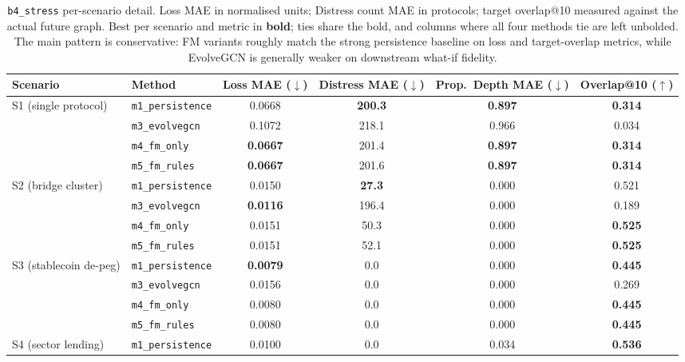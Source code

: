 \begin{table}[!htbp]
\centering
\footnotesize
\setlength{\tabcolsep}{4pt}
\caption{\texttt{b4\_stress} per-scenario detail. Loss MAE in normalised
units; Distress count MAE in protocols; target overlap@10 measured against
the actual future graph. Best per scenario and metric in \textbf{bold};
ties share the bold, and columns where all four methods tie are left
unbolded. The main pattern is conservative: FM variants roughly match the
strong persistence baseline on loss and target-overlap metrics, while
EvolveGCN is generally weaker on downstream what-if fidelity.}
\label{tab:b4_detail}
\begin{tabular}{l l c c c c}
\toprule
Scenario & Method & Loss MAE ($\downarrow$) & Distress MAE ($\downarrow$) & Prop.~Depth MAE ($\downarrow$) & Overlap@10 ($\uparrow$) \\
\midrule
\multirow{4}{*}{S1 (single protocol)}
& \texttt{m1\_persistence} & 0.0668 & \textbf{200.3} & \textbf{0.897} & \textbf{0.314} \\
& \texttt{m3\_evolvegcn}   & 0.1072 & 218.1 & 0.966 & 0.034 \\
& \texttt{m4\_fm\_only}    & \textbf{0.0667} & 201.4 & \textbf{0.897} & \textbf{0.314} \\
& \texttt{m5\_fm\_rules}   & \textbf{0.0667} & 201.6 & \textbf{0.897} & \textbf{0.314} \\
\midrule
\multirow{4}{*}{S2 (bridge cluster)}
& \texttt{m1\_persistence} & 0.0150 & \textbf{27.3} & 0.000 & 0.521 \\
& \texttt{m3\_evolvegcn}   & \textbf{0.0116} & 196.4 & 0.000 & 0.189 \\
& \texttt{m4\_fm\_only}    & 0.0151 & 50.3 & 0.000 & \textbf{0.525} \\
& \texttt{m5\_fm\_rules}   & 0.0151 & 52.1 & 0.000 & \textbf{0.525} \\
\midrule
\multirow{4}{*}{S3 (stablecoin de-peg)}
& \texttt{m1\_persistence} & \textbf{0.0079} & 0.0 & 0.000 & \textbf{0.445} \\
& \texttt{m3\_evolvegcn}   & 0.0156 & 0.0 & 0.000 & 0.269 \\
& \texttt{m4\_fm\_only}    & 0.0080 & 0.0 & 0.000 & \textbf{0.445} \\
& \texttt{m5\_fm\_rules}   & 0.0080 & 0.0 & 0.000 & \textbf{0.445} \\
\midrule
\multirow{4}{*}{S4 (sector lending)}
& \texttt{m1\_persistence} & 0.0100 & 0.0 & 0.034 & \textbf{0.536} \\

\end{tabular}
\end{table}
